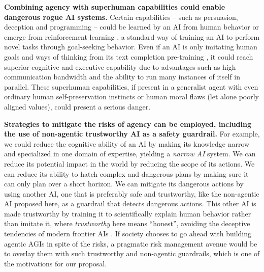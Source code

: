 \textbf{Combining agency with superhuman capabilities could enable dangerous rogue AI systems.} Certain capabilities – such as persuasion, deception and programming – could be learned by an AI from human behavior or emerge from reinforcement learning  \cite{mitpress.mit.edu.9780262039246.reinforcement.learning,arxiv.org.abs.2312.14925}, a standard way of training an AI to perform novel tasks through goal-seeking behavior. Even if an AI is only imitating human goals and ways of thinking from its text completion pre-training \cite{aclanthology.org.N19.1423}, it could reach superior cognitive and executive capability due to advantages such as high communication bandwidth and the ability to run many instances of itself in parallel. These superhuman capabilities, if present in a generalist agent with even ordinary human self-preservation instincts or human moral flaws (let alone poorly aligned values), could present a serious danger. 

\textbf{Strategies to mitigate the risks of agency can be employed, including the use of non-agentic trustworthy AI as a safety guardrail.} For example, we could reduce the cognitive ability of an AI by making its knowledge narrow and specialized in one domain of expertise, yielding a \emph{narrow AI} system. We can reduce its potential impact in the world by reducing the scope of its actions. We can reduce its ability to hatch complex and dangerous plans by making sure it can only plan over a short horizon. We can mitigate its dangerous actions by using another AI, one that is preferably safe and trustworthy, like the non-agentic AI proposed here, as a guardrail that detects dangerous actions. This other AI is made trustworthy by training it to scientifically explain human behavior rather than imitate it, where \textit{trustworthy} here means ``honest'', avoiding the deceptive tendencies of modern frontier AIs \cite{arxiv.org.abs.2412.04984}. 
If society chooses to go ahead with building agentic AGIs in spite of the risks, a pragmatic risk management avenue would be to overlay them with such trustworthy and non-agentic guardrails, which is one of the motivations for our proposal. 

